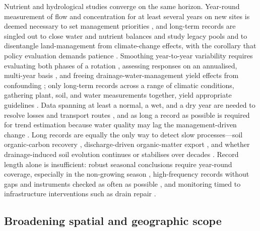 \documentclass[11pt]{article}
\begin{document}
Nutrient and hydrological studies converge on the same horizon.
Year-round measurement of flow and concentration for at least several years
on new sites is deemed necessary to set management priorities
\parencite{Kladivko2001}, and long-term records are singled out to close
water and nutrient balances and study legacy pools \parencite{Sharpley2019}
and to disentangle land-management from climate-change effects, with the
corollary that policy evaluation demands patience
\parencite{Bauwe2020,Kelley2017,Gillingham2000,Lemke2011}. Smoothing
year-to-year variability requires evaluating both phases of a rotation
\parencite{Randall2003,Randall2005}, assessing responses on an annualised,
multi-year basis \parencite{Waring2024,Pittelkow2017}, and freeing
drainage-water-management yield effects from confounding
\parencite{Cooke2012}; only long-term records across a range of climatic
conditions, gathering plant, soil, and water measurements together, yield
appropriate guidelines \parencite{RANDALL1995}. Data spanning at least a
normal, a wet, and a dry year are needed to resolve losses and transport
routes \parencite{vanderSalm2012}, and as long a record as possible is
required for trend estimation because water quality may lag the
management-driven change \parencite{Ulén2007}. Long records are equally the
only way to detect slow processes---soil organic-carbon recovery
\parencite{Kumar2014}, discharge-driven organic-matter export
\parencite{Manninen2023}, and whether drainage-induced soil evolution
continues or stabilises over decades \parencite{Frison2009,Frankl2023}.
Record length alone is insufficient: robust seasonal conclusions require
year-round coverage, especially in the non-growing season
\parencite{Klaiber2020,VanEsbroeck2016}, high-frequency records without
gaps and instruments checked as often as possible \parencite{Hodaj2017},
and monitoring timed to infrastructure interventions such as drain repair
\parencite{Wesström2015}.

\subsection{Broadening spatial and geographic scope}
\end{document}
